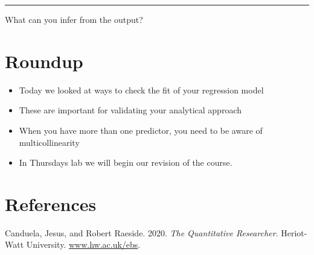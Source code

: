 \documentclass[
]{article}
\providecommand{\tightlist}{%
  \setlength{\itemsep}{0pt}\setlength{\parskip}{0pt}}
\newlength{\cslhangindent}
\newlength{\cslentryspacingunit} %
\newenvironment{CSLReferences}[2] %
 {%
  \setlength{\parindent}{0pt}
  \ifodd #1
  \let\oldpar\par
  \def\par{\hangindent=\cslhangindent\oldpar}
  \fi
  \setlength{\parskip}{#2\cslentryspacingunit}
 }%
 {}
\begin{document}
\begin{center}\rule{0.5\linewidth}{0.5pt}\end{center}

What can you infer from the output?

\hypertarget{roundup}{%
\section{Roundup}\label{roundup}}

\begin{itemize}
\tightlist
\item
  Today we looked at ways to check the fit of your regression model
\item
  These are important for validating your analytical approach
\item
  When you have more than one predictor, you need to be aware of
  multicollinearity
\item
  In Thursdays lab we will begin our revision of the course.
\end{itemize}

\hypertarget{references}{%
\section*{References}\label{references}}

\hypertarget{refs}{}
\begin{CSLReferences}{1}{0}
\leavevmode{}%
Canduela, Jesus, and Robert Raeside. 2020. \emph{The Quantitative
Researcher}. Heriot-Watt University.
\href{https://www.hw.ac.uk/ebs}{www.hw.ac.uk/ebs}.

\end{CSLReferences}
\end{document}
